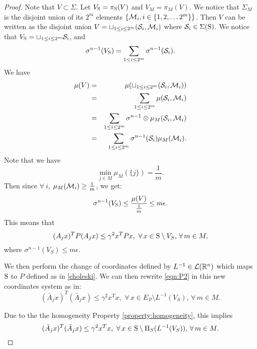 \begin{proof}
Note that $V \subset \Sigma$. Let $V_{\text{S}} = \pi_{\text{S}}(V)$ and $V_M = \pi_M (V)$. We notice that $\Sigma_M$ is the disjoint union of its $2^m$ elements $\{\mathcal{M}_i, i \in \{1,2, \ldots 2^m\} \}$. Then $V$ can be written as the disjoint union $V = \sqcup_{1 \leq i \leq 2^m} (\mathcal{S}_i, \mathcal{M}_i)$ where $\mathcal{S}_i \in \Sigma(\text{S})$. We notice that 
$V_{\text{S}} = \sqcup_{1 \leq i \leq 2^m} \mathcal{S}_i$, 
and
\begin{equation*}
\sigma^{n-1} (V_{\text{S}}) = \sum_{1 \leq i \leq 2^m} \sigma^{n-1} (\mathcal{S}_i).
\end{equation*}
We have 
\begin{eqnarray*}
\mu(V) &=& \mu(\sqcup_{1 \leq i \leq 2^m} (\mathcal{S}_i, \mathcal{M}_i)) \\
&=& \sum_{1 \leq i \leq 2^m} \mu(\mathcal{S}_i, \mathcal{M}_i) \\
 &=& \sum_{1 \leq i \leq 2^m} \sigma^{n-1} \otimes \mu_M (\mathcal{S}_i, \mathcal{M}_i) \\
 & = &\sum_{1 \leq i \leq 2^m} \sigma^{n-1}(\mathcal{S}_i) \mu_M (\mathcal{M}_i).
\end{eqnarray*}
Note that we have $$\min_{j \in M} \mu_M(\{j\}) = \frac{1}{m}.$$ Then since $ \forall \ i$, $\mu_M(\mathcal{M}_i) \geq \frac{1}{m}$, we get:
\begin{equation}
\sigma^{n-1}(V_{\text{S}}) \leq \frac{\mu(V)}{\frac{1}{m}} \leq m \epsilon.
\end{equation}
This means that 
\begin{equation}\label{eqn:P2}(A_j x)^TP(A_j x) \leq {\gamma}^2x^TPx,\,\, \forall\, x \in \text{S} \setminus V_S, \,\forall\, m \in M,\end{equation}
where $\sigma^{n-1}(V_S) \leq m \epsilon.$

We then perform the change of coordinates defined by $L^{-1} \in \mathcal{L}(\mathbb{R}^n)$ which maps $\text{S}$ to $P$ defined as in \eqref{choleski}. We can then rewrite
\eqref{eqn:P2} in this new coordinates system as in: 
\begin{equation}\label{eqn:P}(\bar{A}_j x)^T(\bar{A}_j x) \leq {\gamma}^2x^Tx,\,\, \forall\, x \in E_P\setminus L^{-1}(V_S), \,\forall\, m \in M.\end{equation}

Due to the  the homogeneity Property \ref{property:homogeneity}, this implies
\begin{equation}\label{eqn:P}(\bar{A}_j x)^T(\bar{A}_j x) \leq {\gamma}^2x^Tx,\,\, \forall\, x \in \text{S}\setminus \Pi_S(L^{-1}(V_S)), \,\forall\, m \in M.\end{equation}


\end{proof}
